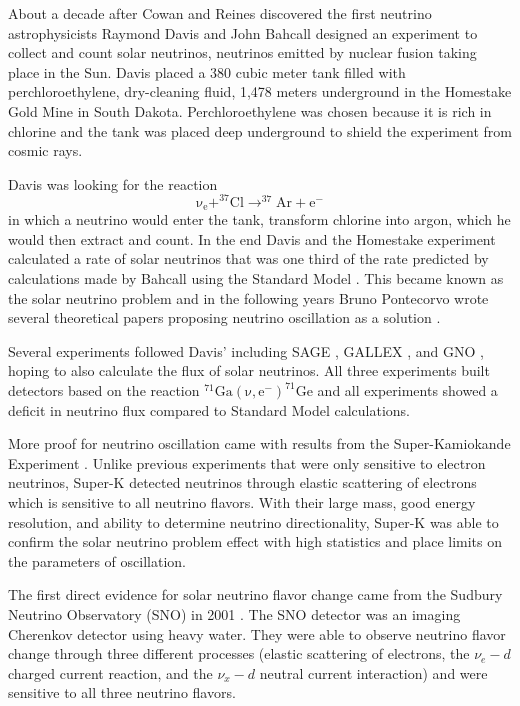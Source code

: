 About a decade after Cowan and Reines discovered the first neutrino astrophysicists Raymond Davis and John Bahcall designed an experiment to collect and count solar neutrinos, neutrinos emitted by nuclear fusion taking place in the Sun. 
Davis placed a 380 cubic meter tank filled with perchloroethylene, dry-cleaning fluid, 1,478 meters underground in the Homestake Gold Mine in South Dakota. 
Perchloroethylene was chosen because it is rich in chlorine and the tank was placed deep underground to shield the experiment from cosmic rays. 

Davis was looking for the reaction 
\begin{equation}
	\mathrm{\nu _{e}+ ^{37}Cl \rightarrow  ^{37}Ar+e^{-}} 
	\label{eq:ClAr}
\end{equation}
in which a neutrino would enter the tank, transform chlorine into argon, which he would then extract and count.
In the end Davis and the Homestake experiment calculated a rate of solar neutrinos that was one third of the rate predicted by calculations made by Bahcall using the Standard Model \cite{Davis}. 
This became known as the solar neutrino problem and in the following years Bruno Pontecorvo wrote several theoretical papers proposing neutrino oscillation as a solution \cite{Pont1968,Pont1977}.

Several experiments followed Davis' including SAGE \cite{Abdurashitov:1994bc}, GALLEX \cite{Hampel:1998xg}, and GNO \cite{Altmann:2000ft,Bellotti:2001ta}, hoping to also calculate the flux of solar neutrinos.
All three experiments built detectors based on the reaction $\mathrm{^{71}Ga(\nu,e^{-})^{71}Ge}$ and all experiments showed a deficit in neutrino flux compared to Standard Model calculations. 

More proof for neutrino oscillation came with results from the Super-Kamiokande Experiment \cite{SuperKOsc}. Unlike previous experiments that were only sensitive to electron neutrinos, Super-K detected neutrinos through elastic scattering of electrons which is sensitive to all neutrino flavors.
With their large mass, good energy resolution, and ability to determine neutrino directionality, Super-K was able to confirm the solar neutrino problem effect with high statistics and place limits on the parameters of oscillation.

The first direct evidence for solar neutrino flavor change came from the Sudbury Neutrino Observatory (SNO) in 2001 \cite{SNO,SNOOsc}. 
The SNO detector was an imaging Cherenkov detector using heavy water.
They were able to observe neutrino flavor change through three different processes (elastic scattering of electrons, the $\nu_e - d$ charged current reaction, and the $\nu_x - d$ neutral current interaction) and were sensitive to all three neutrino flavors.

